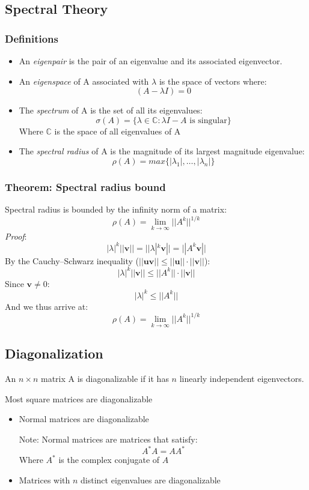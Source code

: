 \documentclass{article}
\begin{document}
\subsection{Spectral Theory}
\subsubsection{Definitions}
\begin{itemize}
\item An \textit{eigenpair} is the pair of an eigenvalue and its associated eigenvector.
\item An \textit{eigenspace} of A associated with $\lambda$ is the space of vectors where:
$$(A-\lambda I) = 0$$
\item The \textit{spectrum} of A is the set of all its eigenvalues:
$$\sigma(A)=\lbrace\lambda \in \mathbb{C}: \lambda I - A \textrm{ is singular}\rbrace$$
Where $\mathbb{C}$ is the space of all eigenvalues of A
\item The \textit{spectral radius} of A is the magnitude of its largest magnitude eigenvalue:
$$\rho(A)=max\lbrace |\lambda_1|, \ldots, |\lambda_n| \rbrace$$

\end{itemize}
\subsubsection{Theorem: Spectral radius bound} Spectral radius is bounded by the infinity norm of a matrix:
$$\rho(A)=\lim_{k\to\infty} ||A^k||^{1/k}$$
\textit{Proof}:
$$|\lambda|^k||\mathbf{v}||=||\lambda|^k\mathbf{v}||=||A^k\mathbf{v}||$$
By the Cauchy–Schwarz inequality ($||\mathbf{u}\mathbf{v}|| \leq ||\mathbf{u}||\cdot||\mathbf{v}||$):
$$|\lambda|^k||\mathbf{v}|| \leq ||A^k||\cdot||\mathbf{v}||$$
Since $\mathbf{v} \neq 0$:
$$|\lambda|^k \leq ||A^k||$$
And we thus arrive at:
$$\rho(A)=\lim_{k\to\infty} ||A^k||^{1/k}$$

\subsection{Diagonalization}
An $n\times n$ matrix A is diagonalizable if it has $n$ linearly independent eigenvectors.

Most square matrices are diagonalizable
\begin{itemize}
\item Normal matrices are diagonalizable

Note: Normal matrices are matrices that satisfy:
$$A^* A=AA^*$$
Where $A^*$ is the complex conjugate of $A$
\item Matrices with $n$ distinct eigenvalues are diagonalizable
\end{itemize}
\end{document}
